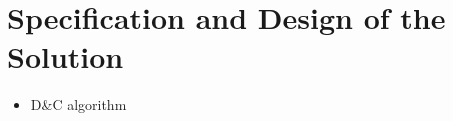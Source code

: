 \section{Specification and Design of the Solution}

\begin{itemize}
    \item D\&C algorithm
\end{itemize}